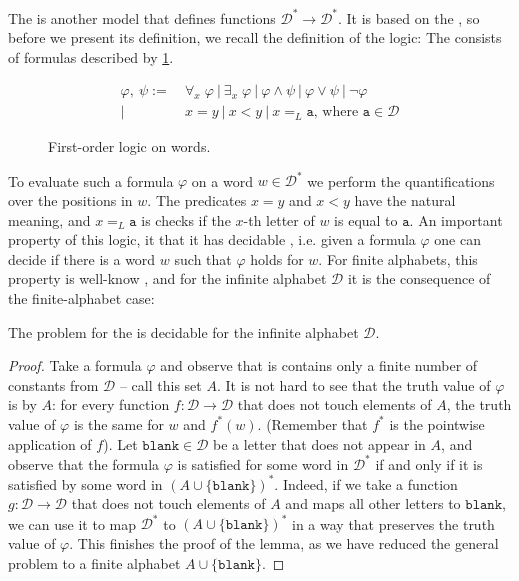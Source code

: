 \AP The  is another model 
that defines functions $\mathcal{D}^* \to \mathcal{D}^*$. It is based on the ,
so before we present its definition, we recall the definition of the logic: The 
consists of formulas described by \cref{fig:fo-syntax}.
\begin{figure}[h]
    \centering
    \begin{align*}
        \varphi,\ \psi :=&~ \forall_x\; \varphi ~|~ \exists_x\; \varphi ~|~ \varphi \wedge \psi ~|~ \varphi \vee \psi ~|~ \neg \varphi \\
                |&~ x = y ~|~ x < y ~|~ x =_L \mathtt{a} \textrm{, where } \mathtt{a} \in \mathcal{D}
    \end{align*}
    \caption{First-order logic on words.}
    \label{fig:fo-syntax}
\end{figure}
To evaluate such a formula $\varphi$ on a word $w \in \mathcal{D}^*$ we perform the quantifications
over the positions in $w$. The predicates $x = y$ and $x < y$ have the natural 
meaning, and $x =_L \mathtt{a}$ is checks if the $x$-th letter of $w$ is equal to $\mathtt{a}$.
An important property of this logic, it that it has decidable , i.e. given a formula
$\varphi$ one can decide if there is a word $w$ such that $\varphi$ holds for $w$. For finite alphabets,
this property is well-know \cite{buchi1960weak}, and for the infinite alphabet $\mathcal{D}$ it is 
the consequence of the finite-alphabet case:
\begin{lemma}
    \label{lem:fo-emptiness}
    The  problem for the  is decidable for the infinite alphabet $\mathcal{D}$.
\end{lemma}
\begin{proof}
    Take a formula $\varphi$ and observe that is contains only a finite number of constants from $\mathcal{D}$ -- call this set $A$.
    It is not hard to see that the truth value of $\varphi$ is  by $A$: for every function $f : \mathcal{D} \to \mathcal{D}$
    that does not touch 
    elements of $A$, the truth value of $\varphi$ is the same for $w$ and $f^*(w)$. (Remember that 
    $f^*$ is the pointwise application of $f$). 
    Let $\mathtt{blank} \in \mathcal{D}$ be a letter that does not appear in $A$,
    and observe that the formula $\varphi$ is satisfied for some word in $\mathcal{D}^*$ if and only if it is satisfied by
    some word in $(A \cup \{\mathtt{blank}\})^*$. Indeed, if we take a function $g: \mathcal{D} \to \mathcal{D}$ that does not touch elements of $A$
    and maps all other letters to $\mathtt{blank}$, we can use it to map $\mathcal{D}^*$ to $(A \cup \{\mathtt{blank}\})^*$ in a way 
    that preserves the truth value of $\varphi$.
    This finishes the proof of the lemma, as we have reduced the general problem to a finite alphabet $A \cup \{\mathtt{blank}\}$.
\end{proof}

